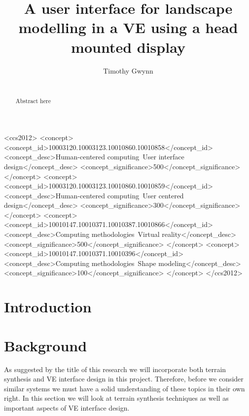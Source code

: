 \documentclass{sig-alternate-05-2015}
\begin{document}
\title{A user interface for landscape modelling in a VE using a head mounted display}

\author{
\alignauthor
Timothy Gwynn\\
       \\
}
\maketitle
\begin{CCSXML}
 	<ccs2012>
 	<concept>
 	<concept_id>10003120.10003123.10010860.10010858</concept_id>
 	<concept_desc>Human-centered computing~User interface design</concept_desc>
 	<concept_significance>500</concept_significance>
 	</concept>
 	<concept>
 	<concept_id>10003120.10003123.10010860.10010859</concept_id>
 	<concept_desc>Human-centered computing~User centered design</concept_desc>
 	<concept_significance>300</concept_significance>
 	</concept>
 	<concept>
 	<concept_id>10010147.10010371.10010387.10010866</concept_id>
 	<concept_desc>Computing methodologies~Virtual reality</concept_desc>
 	<concept_significance>500</concept_significance>
 	</concept>
 	<concept>
 	<concept_id>10010147.10010371.10010396</concept_id>
 	<concept_desc>Computing methodologies~Shape modeling</concept_desc>
 	<concept_significance>100</concept_significance>
 	</concept>
 	</ccs2012>
\end{CCSXML}
 
 

\printccsdesc
{}
\begin{abstract}
	Abstract here
\end{abstract}
\section{Introduction}
\section{Background}
As suggested by the title of this research we will incorporate both terrain synthesis and VE interface design in this project. Therefore, before we consider similar systems we must have a solid understanding of these topics in their own right. In this section we will look at terrain synthesis techniques as well as important aspects of VE interface design.\\
\end{document}
